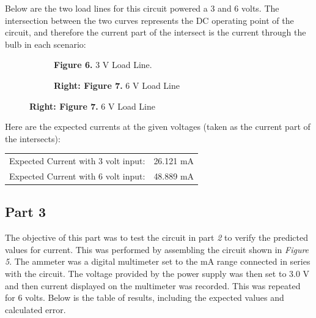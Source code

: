 \documentclass[12pt]{article}
\begin{document}
Below are the two load lines for this circuit powered a 3 and 6 volts. The intersection between the two curves represents the DC operating point of the circuit, and therefore the current part of the intersect is the current through the bulb in each scenario:\par
%
\begin{figure}[htb!]
  \begin{subfigure}[b]{0.5\textwidth}
  		\caption*{\textbf{Figure 6.} 3 V Load Line.}
    	\resizebox{1\textwidth}{!}{}
  \end{subfigure}
  \hspace{0.25in}
  \begin{subfigure}[b]{0.5\textwidth}
  		\caption*{\textbf{Right: Figure 7.} 6 V Load Line}
    	\resizebox{1\textwidth}{!}{}
  \end{subfigure}
\end{figure}
%
\pagebreak
%
Here are the expected currents at the given voltages (taken as the current part of the intersects):
\begin{center}
\begin{tabular}{l r}
Expected Current with 3 volt input: & 26.121 mA \\ %
Expected Current with 6 volt input: & 48.889 mA %
\end{tabular}
\end{center}

\subsection*{Part 3}
The objective of this part was to test the circuit in part \textit{2} to verify the predicted values for current. This was performed by assembling the circuit shown in \textit{Figure 5}. The ammeter was a digital multimeter set to the mA range connected in series with the circuit. The voltage provided by the power supply was then set to 3.0 V and then current displayed on the multimeter was recorded. This was repeated for 6 volts. Below is the table of results, including the expected values and calculated error.\par
\end{document}
